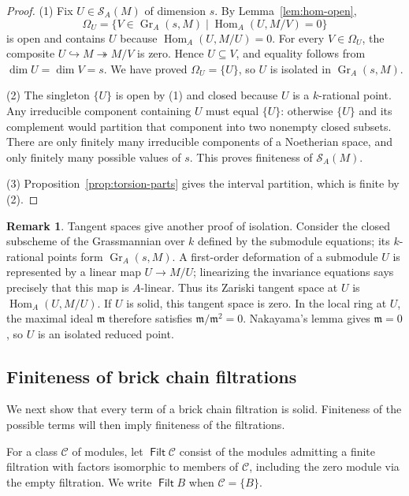 \documentclass[a4paper,reqno,10pt]{amsart}
\theoremstyle{definition}
\newtheorem{remark}[theorem]{Remark}
\numberwithin{equation}{section}
\newcommand{\Hom}{\operatorname{Hom}}
\newcommand{\Gr}{\operatorname{Gr}}
\DeclareMathOperator{\Filt}{\mathsf{Filt}}
\newcommand{\Sol}{\mathcal S}
\begin{document}
\begin{proof}
(1) Fix $U\in\Sol_A(M)$ of dimension $s$. By Lemma~\ref{lem:hom-open},
\[
 \Omega_U=\{V\in\Gr_A(s,M)\mid\Hom_A(U,M/V)=0\}
\]
is open and contains $U$ because $\Hom_A(U,M/U)=0$. For every
$V\in\Omega_U$,
the composite $U\hookrightarrow M\twoheadrightarrow M/V$ is zero.
Hence $U\subseteq V$, and equality follows from $\dim U=\dim V=s$.
We have proved $\Omega_U=\{U\}$, so $U$ is isolated in
$\Gr_A(s,M)$.

(2) The singleton $\{U\}$ is open by (1) and closed because $U$ is a
$k$-rational point. Any irreducible component containing $U$ must equal
$\{U\}$: otherwise $\{U\}$ and its complement would partition that
component into two nonempty closed subsets. There are only finitely many
irreducible components of a Noetherian space, and only finitely many possible
values of $s$. This proves finiteness of $\Sol_A(M)$.

(3) Proposition~\ref{prop:torsion-parts} gives the interval partition,
which is finite by (2).
\end{proof}

\begin{remark}
Tangent spaces give another proof of isolation. Consider the closed
subscheme of the Grassmannian over $k$ defined by the submodule equations;
its $k$-rational points form $\Gr_A(s,M)$. A first-order deformation of a
submodule $U$ is represented by a linear map $U\to M/U$; linearizing
the invariance equations says precisely that this map is $A$-linear.
Thus its Zariski tangent space at $U$ is $\Hom_A(U,M/U)$.
If $U$ is solid, this tangent space is zero. In the local ring at $U$,
the maximal ideal $\mathfrak m$ therefore satisfies
$\mathfrak m/\mathfrak m^2=0$. Nakayama's lemma gives $\mathfrak m=0$,
so $U$ is an isolated reduced point.
\end{remark}

\subsection{Finiteness of brick chain filtrations}

We next show that every term of a brick chain filtration is solid.
Finiteness of the possible terms will then imply finiteness of the
filtrations.

For a class $\mathcal C$ of modules, let $\Filt\mathcal C$ consist of
the modules admitting a finite filtration with factors isomorphic to
members of $\mathcal C$, including the zero module via the empty
filtration. We write $\Filt B$ when $\mathcal C=\{B\}$.
\end{document}
